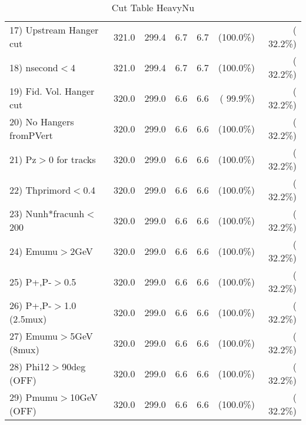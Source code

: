 \begin{table}[h!]
\begin{tabular}{||l||r|r|r|r|r|r||}
 17) Upstream Hanger cut  &        321.0 &        299.4 &          6.7 &          6.7 & (100.0\%) & ( 32.2\%) \\
 18) nsecond$<$4          &        321.0 &        299.4 &          6.7 &          6.7 & (100.0\%) & ( 32.2\%) \\
 19) Fid. Vol. Hanger cut &        320.0 &        299.0 &          6.6 &          6.6 & ( 99.9\%) & ( 32.2\%) \\
 20) No Hangers fromPVert &        320.0 &        299.0 &          6.6 &          6.6 & (100.0\%) & ( 32.2\%) \\
 21) Pz$>$0 for tracks    &        320.0 &        299.0 &          6.6 &          6.6 & (100.0\%) & ( 32.2\%) \\
 22) Thprimord$<$0.4      &        320.0 &        299.0 &          6.6 &          6.6 & (100.0\%) & ( 32.2\%) \\
 23) Nunh*fracunh$<$200   &        320.0 &        299.0 &          6.6 &          6.6 & (100.0\%) & ( 32.2\%) \\
 24) Emumu$>$2GeV         &        320.0 &        299.0 &          6.6 &          6.6 & (100.0\%) & ( 32.2\%) \\
 25) P+,P-$>$0.5          &        320.0 &        299.0 &          6.6 &          6.6 & (100.0\%) & ( 32.2\%) \\
 26) P+,P-$>$1.0 (2.5mux) &        320.0 &        299.0 &          6.6 &          6.6 & (100.0\%) & ( 32.2\%) \\
 27) Emumu$>$5GeV  (8mux) &        320.0 &        299.0 &          6.6 &          6.6 & (100.0\%) & ( 32.2\%) \\
 28) Phi12$>$90deg  (OFF) &        320.0 &        299.0 &          6.6 &          6.6 & (100.0\%) & ( 32.2\%) \\
 29) Pmumu$>$10GeV  (OFF) &        320.0 &        299.0 &          6.6 &          6.6 & (100.0\%) & ( 32.2\%) \\
 \hline
 \hline
 \end{tabular}
 \caption{Cut Table  HeavyNu  }
 \label{tab-cutheavy_neutrino}
 \end{table}
